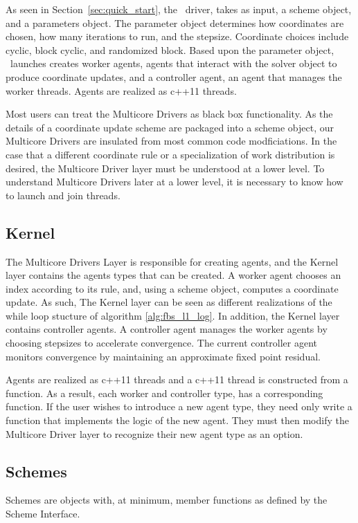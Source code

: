 As seen in Section~\ref{sec:quick_start}, the \pkg~driver, takes as input, a scheme object, and a parameters object.
The parameter object determines how coordinates are chosen, how many iterations to run, and the stepsize.
Coordinate choices include cyclic, block cyclic, and randomized block. 
Based upon the parameter object, \pkg~launches creates  worker agents, agents that interact with the solver object to produce coordinate updates, and a controller agent, an agent that manages the worker threads.
Agents are realized as c++11 threads.

Most users can treat the Multicore Drivers as black box functionality.
As the details of a coordinate update scheme are packaged into a scheme object, our Multicore Drivers are insulated from most common code modficiations.
In the case that a different coordinate rule or a specialization of work distribution is desired, the Multicore Driver layer must be understood at a lower level.
To understand  Multicore Drivers later at a lower level, it is necessary to know how to launch and join threads.


\subsection{Kernel}


The Multicore Drivers Layer is responsible for creating agents, and the Kernel layer contains the agents types that can be created.
A worker agent chooses an index according to its rule, and, using a scheme object, computes a coordinate update.
As such, The Kernel layer can be seen as different realizations of the while loop stucture of algorithm \ref{alg:fbs_l1_log}.
In addition, the Kernel layer contains controller agents.
A controller agent manages the worker agents by choosing stepsizes to accelerate convergence.
The current controller agent monitors convergence by maintaining an approximate fixed point residual.

Agents are realized as c++11 threads and a c++11 thread is constructed from a function.
As a result, each worker and controller type, has  a corresponding function.
If the user wishes to introduce a new agent type, they need only write a function that implements the logic of the new agent.
They must then modify the Multicore Driver layer to recognize their new agent type as an option.

\subsection{Schemes}
Schemes are objects with, at minimum, member functions as defined by the Scheme Interface.

